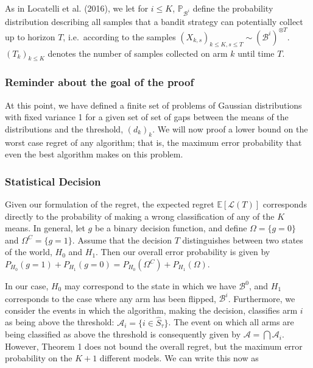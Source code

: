 \documentclass[12pt,]{article}
\begin{document}
As in Locatelli et al. (2016), we let for \(i \leq K\),
\(\mathbb{P}_{\mathcal{B}^i}\) define the probability distribution
describing all samples that a bandit strategy can potentially collect up
to horizon \(T\), i.e.~according to the samples
\((X_{k,s})_{k\leq K, s \leq T} \sim (\mathcal{B}^i)^{\otimes T}\).
\((T_k)_{k\leq K}\) denotes the number of samples collected on arm \(k\)
until time \(T\).

\subsubsection{Reminder about the goal of the
proof}\label{reminder-about-the-goal-of-the-proof}

At this point, we have defined a finite set of problems of Gaussian
distributions with fixed variance 1 for a given set of set of gaps
between the means of the distributions and the threshold, \((d_k)_k\).
We will now proof a lower bound on the worst case regret of any
algorithm; that is, the maximum error probability that even the best
algorithm makes on this problem.

\subsubsection{Statistical Decision}\label{statistical-decision}

Given our formulation of the regret, the expected regret
\(\mathbb{E}[\mathcal{L}(T)]\) corresponds directly to the probability
of making a wrong classification of any of the \(K\) means. In general,
let \(g\) be a binary decision function, and define
\(\Omega = \{g = 0\}\) and \(\Omega^C = \{g = 1\}\). Assume that the
decision \(T\) distinguishes between two states of the world, \(H_0\)
and \(H_1\). Then our overall error probability is given by
\(P_{H_0}(g=1) + P_{H_1}(g = 0) = P_{H_0}(\Omega^C) + P_{H_1}(\Omega)\).

In our case, \(H_0\) may correspond to the state in which we have
\(\mathcal{B}^0\), and \(H_1\) corresponds to the case where any arm has
been flipped, \(\mathcal{B}^i\). Furthermore, we consider the events in
which the algorithm, making the decision, classifies arm \(i\) as being
above the threshold: \(\mathcal{A}_i = \{i \in \hat{S}_\tau\}\). The
event on which all arms are being classified as above the threshold is
consequently given by \(\mathcal{A} = \bigcap \mathcal{A}_i\). However,
Theorem 1 does not bound the overall regret, but the maximum error
probability on the \(K+1\) different models. We can write this now as
\end{document}
